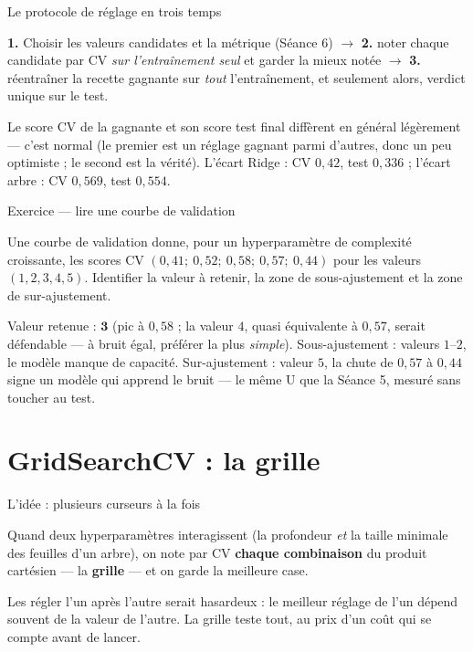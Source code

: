 \documentclass[aspectratio=169,11pt]{beamer}
\begin{document}
\begin{frame}{Le protocole de réglage en trois temps}
\begin{ucadret}
{\small \textbf{1.} Choisir les valeurs candidates et la métrique (Séance 6) $\to$ \textbf{2.} noter chaque candidate par CV \emph{sur l'entraînement seul} et garder la mieux notée $\to$ \textbf{3.} réentraîner la recette gagnante sur \emph{tout} l'entraînement, et seulement alors, verdict unique sur le test.}
\end{ucadret}
{\small Le score CV de la gagnante et son score test final diffèrent en général légèrement — c'est normal (le premier est un réglage gagnant parmi d'autres, donc un peu optimiste ; le second est la vérité). L'écart Ridge : CV $0{,}42$, test $0{,}336$ ; l'écart arbre : CV $0{,}569$, test $0{,}554$.}
\end{frame}

\begin{frame}{Exercice — lire une courbe de validation}
\begin{ucadrec}[Énoncé]
{\small Une courbe de validation donne, pour un hyperparamètre de complexité croissante, les scores CV $(0{,}41;\ 0{,}52;\ 0{,}58;\ 0{,}57;\ 0{,}44)$ pour les valeurs $(1, 2, 3, 4, 5)$. Identifier la valeur à retenir, la zone de sous-ajustement et la zone de sur-ajustement.}
\end{ucadrec}
\pause
\begin{ucadex}[Correction]
{\small Valeur retenue : $\mathbf{3}$ (pic à $0{,}58$ ; la valeur $4$, quasi équivalente à $0{,}57$, serait défendable — à bruit égal, préférer la plus \emph{simple}). Sous-ajustement : valeurs $1$–$2$, le modèle manque de capacité. Sur-ajustement : valeur $5$, la chute de $0{,}57$ à $0{,}44$ signe un modèle qui apprend le bruit — le même U que la Séance 5, mesuré sans toucher au test.}
\end{ucadex}
\end{frame}

\section{GridSearchCV : la grille}

\begin{frame}{L'idée : plusieurs curseurs à la fois}
\begin{ucaddef}
{\small Quand deux hyperparamètres interagissent (la profondeur \emph{et} la taille minimale des feuilles d'un arbre), on note par CV \textbf{chaque combinaison} du produit cartésien — la \textbf{grille} — et on garde la meilleure case.}
\end{ucaddef}
{\small Les régler l'un après l'autre serait hasardeux : le meilleur réglage de l'un dépend souvent de la valeur de l'autre. La grille teste tout, au prix d'un coût qui se compte avant de lancer.}
\end{frame}
\end{document}
